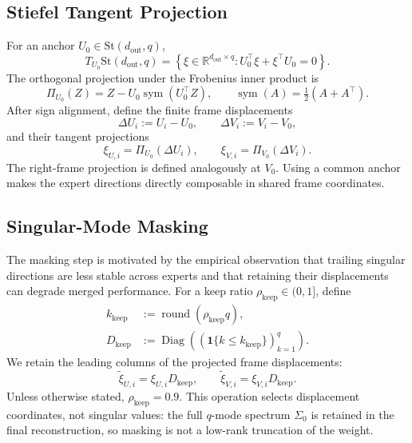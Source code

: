\documentclass[11pt, a4paper]{utda}
\theoremstyle{plain}
\theoremstyle{definition}
\theoremstyle{remark}
\begin{document}
\subsection{Stiefel Tangent Projection}
\label{app:iso_merger_projection}

For an anchor $U_0\in\mathrm{St}(d_{\mathrm{out}},q)$,
\begin{equation}
\label{eq:app_iso_merger_tangent_space}
    T_{U_0}\mathrm{St}(d_{\mathrm{out}},q)
    =\left\{\xi\in\mathbb R^{d_{\mathrm{out}}\times q}:
        U_0^\top\xi+\xi^\top U_0=0\right\}.
\end{equation}
The orthogonal projection under the Frobenius inner product is
\begin{equation}
\label{eq:app_stiefel_tangent_projection}
    \Pi_{U_0}(Z)
    =Z-U_0\operatorname{sym}(U_0^\top Z),
    \qquad \operatorname{sym}(A)=\tfrac12(A+A^\top).
\end{equation}
After sign alignment, define the finite frame displacements
\begin{equation}
\label{eq:iso_merger_frame_displacements}
    \Delta U_i:=U_i-U_0,
    \qquad \Delta V_i:=V_i-V_0,
\end{equation}
and their tangent projections
\begin{equation}
\label{eq:app_iso_merger_tangent_directions}
    \xi_{U,i}=\Pi_{U_0}(\Delta U_i),
    \qquad \xi_{V,i}=\Pi_{V_0}(\Delta V_i).
\end{equation}
The right-frame projection is defined analogously at $V_0$.
Using a common anchor makes the expert directions directly composable
in shared frame coordinates.

\subsection{Singular-Mode Masking}
\label{app:topk}

The masking step is motivated by the empirical observation that
trailing singular directions are less stable across experts and that
retaining their displacements can degrade merged performance.
For a keep ratio $\rho_{\mathrm{keep}}\in(0,1]$, define
\begin{equation}
\label{eq:iso_merger_mask}
\begin{aligned}
    k_{\mathrm{keep}}
    &:=\operatorname{round}(\rho_{\mathrm{keep}}q),\\
    D_{\mathrm{keep}}
    &:=\operatorname{Diag}
       \left((\mathbf 1\{k\leq k_{\mathrm{keep}}\})_{k=1}^{q}\right).
\end{aligned}
\end{equation}
We retain the leading columns of the projected frame displacements:
\begin{equation}
\label{eq:iso_merger_masked_directions}
    \widetilde\xi_{U,i}=\xi_{U,i}D_{\mathrm{keep}},
    \qquad
    \widetilde\xi_{V,i}=\xi_{V,i}D_{\mathrm{keep}}.
\end{equation}
Unless otherwise stated, $\rho_{\mathrm{keep}}=0.9$.
This operation selects displacement coordinates, not singular values:
the full $q$-mode spectrum $\Sigma_0$ is retained in the final
reconstruction, so masking is not a low-rank truncation of the weight.
\end{document}
